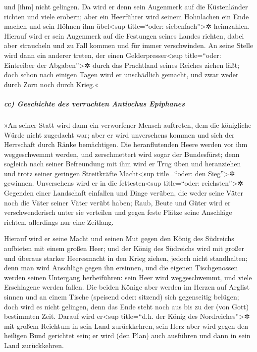 und {[}ihm{]} nicht gelingen. Da wird er denn sein
Augenmerk auf die Küstenländer richten und viele erobern; aber ein
Heerführer wird seinem Hohnlachen ein Ende machen und sein Höhnen ihm
übel\textless sup title=``oder: siebenfach''\textgreater✲ heimzahlen.
Hierauf wird er sein Augenmerk auf die Festungen seines
Landes richten, dabei aber straucheln und zu Fall kommen und für immer
verschwinden. An seine Stelle wird dann ein anderer
treten, der einen Gelderpresser\textless sup title=``oder: Eintreiber
der Abgaben''\textgreater✲ durch das Prachtland seines Reiches ziehen
läßt; doch schon nach einigen Tagen wird er unschädlich gemacht, und
zwar weder durch Zorn noch durch Krieg.«

\hypertarget{cc-geschichte-des-verruchten-antiochus-epiphanes}{%
\subparagraph{cc) Geschichte des verruchten Antiochus
Epiphanes}\label{cc-geschichte-des-verruchten-antiochus-epiphanes}}

»An seiner Statt wird dann ein verworfener Mensch
auftreten, dem die königliche Würde nicht zugedacht war; aber er wird
unversehens kommen und sich der Herrschaft durch Ränke bemächtigen.
Die heranflutenden Heere werden vor ihm weggeschwemmt
werden, und zerschmettert wird sogar der Bundesfürst;
denn sogleich nach seiner Befreundung mit ihm wird er
Trug üben und heranziehen und trotz seiner geringen Streitkräfte
Macht\textless sup title=``oder: den Sieg''\textgreater✲ gewinnen.
Unversehens wird er in die fettesten\textless sup
title=``oder: reichsten''\textgreater✲ Gegenden einer Landschaft
einfallen und Dinge verüben, die weder seine Väter noch die Väter seiner
Väter verübt haben; Raub, Beute und Güter wird er verschwenderisch unter
sie verteilen und gegen feste Plätze seine Anschläge richten, allerdings
nur eine Zeitlang.

Hierauf wird er seine Macht und seinen Mut gegen den
König des Südreichs aufbieten mit einem großen Heer; und der König des
Südreichs wird mit großer und überaus starker Heeresmacht in den Krieg
ziehen, jedoch nicht standhalten; denn man wird Anschläge gegen ihn
ersinnen, und die eigenen Tischgenossen werden seinen
Untergang herbeiführen: sein Heer wird weggeschwemmt, und viele
Erschlagene werden fallen. Die beiden Könige aber werden
im Herzen auf Arglist sinnen und an einem Tische (speisend oder:
sitzend) sich gegenseitig belügen; doch wird es nicht gelingen, denn das
Ende steht noch aus bis zu der (von Gott) bestimmten Zeit.
Darauf wird er\textless sup title=``d.h. der König des
Nordreiches''\textgreater✲ mit großem Reichtum in sein Land
zurückkehren, sein Herz aber wird gegen den heiligen Bund gerichtet
sein; er wird (den Plan) auch ausführen und dann in sein Land
zurückkehren.

